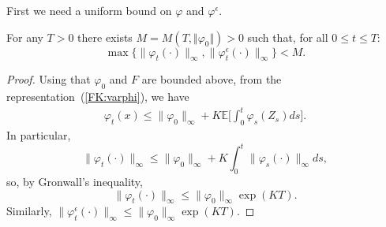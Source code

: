 \documentclass[EJP]{ejpecp} %
\newcommand{\IE}{\mathbb E}
\begin{document}
First we need a uniform bound on $\varphi$ and $\varphi^\epsilon$.  
\begin{lemma} 
\label{BoundednessVarphis}
For any $T>0$ there exists $M = M(T, \Vert \varphi_0 \Vert) >0$ such that, 
for all $0 \leq t \leq T$:
\[ \max\{ \| \varphi_t(\cdot) \|_\infty, \| \varphi^\epsilon_t(\cdot) \|_\infty\} 
< M.
 \]
\end{lemma}
\begin{proof}
Using that $\varphi_0$ and $F$ are bounded above, from the
representation~(\ref{FK:varphi}), we have
\begin{align*}
\varphi_t(x) \leq \| \varphi_0 \|_\infty + 
K \IE\Big[\int_0^t \varphi_s(Z_s) ds\Big].
\end{align*}
In particular, %
\[ \| \varphi_t(\cdot) \|_\infty \leq \| \varphi_0 \|_\infty
+  K \int_0^t \| \varphi_s(\cdot) \|_\infty ds, \]
so, by Gronwall's inequality,
\[ \| \varphi_t(\cdot) \|_\infty \leq \| \varphi_0 \|_\infty \exp\left( K T \right). \]
Similarly,
$\| \varphi^\epsilon_t(\cdot) \|_{\infty} \leq \| \varphi_0 \|_\infty \exp\left( K T \right) $.
\end{proof}
\end{document}
